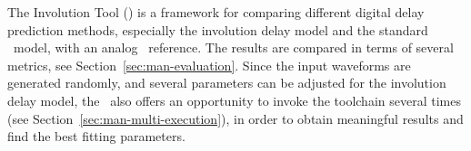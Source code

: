 The Involution Tool (\invt) is a framework for comparing different digital 
delay prediction methods, especially the involution delay model and the 
standard \modelsim\ model, with an analog \spice\ reference. The results are 
compared in terms of several metrics, see Section~\ref{sec:man-evaluation}.
Since the input waveforms are generated randomly, and several parameters can be 
adjusted for the involution delay model, the \invt\ also offers an opportunity 
to invoke the toolchain several times (see 
Section~\ref{sec:man-multi-execution}), in order to obtain meaningful results 
and find the best fitting parameters.
